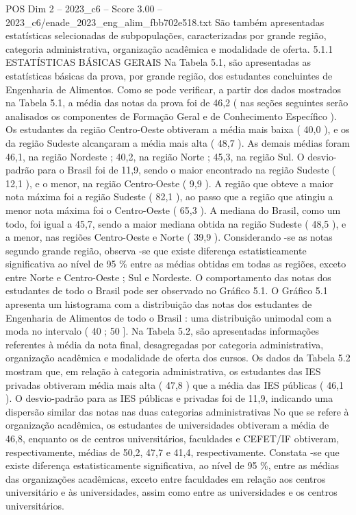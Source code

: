 \begin{textsample}{POS Dim 2 – 2023\_c6 – Score 3.00 – 2023\_c6/enade\_2023\_eng\_alim\_fbb702e518.txt}
São também apresentadas estatísticas selecionadas de subpopulações, caracterizadas por grande região, categoria administrativa, organização acadêmica e modalidade de oferta. 5.1.1 ESTATÍSTICAS BÁSICAS GERAIS Na Tabela 5.1, são apresentadas as estatísticas básicas da prova, por grande região, dos estudantes concluintes de Engenharia de Alimentos.
Como se pode verificar, a partir dos dados mostrados na Tabela 5.1, a média das notas da prova foi de 46,2 ( nas seções seguintes serão analisados os componentes de Formação Geral e de Conhecimento Específico ).
Os estudantes da região Centro-Oeste obtiveram a média mais baixa ( 40,0 ), e os da região Sudeste alcançaram a média mais alta ( 48,7 ).
As demais médias foram 46,1, na região Nordeste ; 40,2, na região Norte ; 45,3, na região Sul.
O desvio-padrão para o Brasil foi de 11,9, sendo o maior encontrado na região Sudeste ( 12,1 ), e o menor, na região Centro-Oeste ( 9,9 ).
A região que obteve a maior nota máxima foi a região Sudeste ( 82,1 ), ao passo que a região que atingiu a menor nota máxima foi o Centro-Oeste ( 65,3 ).
A mediana do Brasil, como um todo, foi igual a 45,7, sendo a maior mediana obtida na região Sudeste ( 48,5 ), e a menor, nas regiões Centro-Oeste e Norte ( 39,9 ).
Considerando -se as notas segundo grande região, observa -se que existe diferença estatisticamente significativa ao nível de 95 \% entre as médias obtidas em todas as regiões, exceto entre Norte e Centro-Oeste ; Sul e Nordeste.
O comportamento das notas dos estudantes de todo o Brasil pode ser observado no Gráfico 5.1.
O Gráfico 5.1 apresenta um histograma com a distribuição das notas dos estudantes de Engenharia de Alimentos de todo o Brasil : uma distribuição unimodal com a moda no intervalo ( 40 ; 50 ].
Na Tabela 5.2, são apresentadas informações referentes à média da nota final, desagregadas por categoria administrativa, organização acadêmica e modalidade de oferta dos cursos.
Os dados da Tabela 5.2 mostram que, em relação à categoria administrativa, os estudantes das IES privadas obtiveram média mais alta ( 47,8 ) que a média das IES públicas ( 46,1 ).
O desvio-padrão para as IES públicas e privadas foi de 11,9, indicando uma dispersão similar das notas nas duas categorias administrativas No que se refere à organização acadêmica, os estudantes de universidades obtiveram a média de 46,8, enquanto os de centros universitários, faculdades e CEFET/IF obtiveram, respectivamente, médias de 50,2, 47,7 e 41,4, respectivamente.
Constata -se que existe diferença estatisticamente significativa, ao nível de 95 \%, entre as médias das organizações acadêmicas, exceto entre faculdades em relação aos centros universitário e às universidades, assim como entre as universidades e os centros universitários.

\end{textsample}
